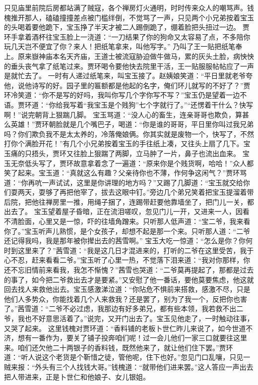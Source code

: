 \documentclass[12pt,oneside]{book}
\begin{document}
只见庙里前院后房都站满了贼寇，各个禅房灯火通明，时时传来众人的嘲骂声。钱槐推开那人，磕磕撞撞差点被门槛绊倒，不觉骂了一声，只见两个小兄弟按着宝玉的头喝着要他跪下，宝玉挣了半天才被二人踢倒跪了，绷着脸把头扭过一边。
贾环手拿着酒杯往宝玉脸上一浇道：“一刀结果了你的狗命又太容易了点，不多陪你玩几天岂不便宜了你？来人！把纸笔拿来，叫他写字。”
乃叫了王一贴把纸笔奉上。原来嶽神庙本名天齐庙，王道士被流寇胁迫做牛做马，累的灰头土脸，病怏怏的垂头丧气拿了纸笔过来。贾环喝令要他快去院里干活，王一贴服服帖帖应了一声是就忙去了。
一时有人递过纸笔来，叫宝玉接了。赵姨娘笑道：“平日里就老爷夸他，说他诗写的好。园子里的匾额都是他起的名字，俺们环儿就写的不好了？”贾环冷笑道：“你不是写的好吗，我叫你写几个字你写不写？”宝玉仍是望着一边不语。贾环道：“你给我写着“我宝玉是个贱狗”七个字就行了。”“还愣着干什么？快写啊！”说完朝背上狠踹几脚。
宝玉骂道：“没人心的畜生，连亲哥哥也欺负，算甚么英雄！”贾环朝脸就是几个嘴巴子，喝道：“你是谁的哥哥，平日里你叫过我兄弟吗？你们欺负我不是太太养的，冷落俺娘俩。你其实就是废物一个，快写了，不然打你个满脸开花！”有几个小兄弟按着宝玉的手往纸上凑，又往头上扇了几下。宝玉痛的只捂头，贾环又往脸上狠踹了两脚，立马肿了一片，鼻子也流出血来。
宝玉无奈低头写了，贾环故意拿着念了一遍道：“原来你是个贱货啊，哈哈！”众人都笑了起来。宝玉道：“真就这么有趣？父亲待你也不薄，作何争这闲气？”贾环骂道：“你再吭一声试试，这里是你讲理的地方吗？”又踢了几脚道：“宝玉就交给你们耍两天，耍够了再把他宰了，拔去这眼中钉。”旁边几个弟兄笑着把宝玉提溜着带后院，把他往禅房里一推，用绳子捆了，连踢带赶要他靠墙坐了，把门儿一关，都出去了。
宝玉望着屋子昏暗，正在流泪嗟叹，忽见门儿一开，又进来一人，因看不清脸面，心里又是一惊，吓的往墙角蹭来。只听那人低声道：“宝二爷，我来看你了。”宝玉听声儿熟惯，是个女孩子，却想不起是那一个来。只听那人道：“二爷还记得我吗，我是那年被你撵出去的茜雪啊。”
宝玉大吃一惊道：“怎么是你？你何时到这里来了？”茜雪道：“我是这几日才混进来的，打听的二爷在这里受苦，我于心不忍，赶来看看二爷。”宝玉听了心里一热，不觉落下泪来道：“我对你那样，你还不忘旧情前来看我，我怎不惭愧？”茜雪也哭道：“二爷莫再提起了，那都是过去的事了，如今把二爷救出去才是要紧。”又安慰了他一番话，要他莫要焦虑，他这就回去找人来救他出去。宝玉感激涕泣道：“你阽危不惧前来搭救，感激不尽，只是他们人多势众，你能找着几个人来救我？还是罢了，别为了我一个，反把你也害了。”茜雪道：“二爷不必过虑，我那边有好多弟兄，都有些本领，我若救不出二爷，我也不好意思活着了。”说完，又开门出去了。宝玉见他走了，一时触动往事，又哭了起来。
这里钱槐对贾环道：“香料铺的老板卜世仁昨儿来说了，如今世道不济，想有一番作为，要关了铺子投奔咱们呢！过一会儿他们一家三口就要往这里来。咱们还欠他二十两银子的香料钱，既然他来了，就让他们住下罢。”贾环道：“听人说这个老货是个靳惜之徒，管他呢，住下也好。”忽见门口乱嚷，只见一贼来报：“外头有三个人找钱大哥。”钱槐道：“就带他们进来罢。”这人答应一声出去把人带进来，正是卜世仁和他娘子、女儿银姐。
\end{document}
